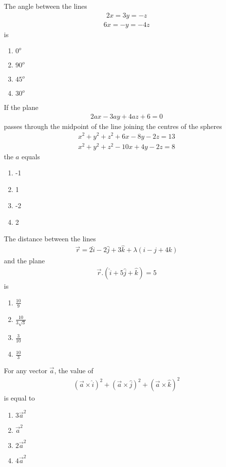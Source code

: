 \item The angle between the lines
\begin{align*}
2x=3y=-z
\end{align*}
\begin{align*}
6x=-y=-4z
\end{align*}
is
\begin{enumerate}
\item $0^{o}$
\item $90^{o}$
\item $45^{o}$
\item $30^{o}$
\end{enumerate}

\item If the plane
\begin{align*}
2ax-3ay+4az+6=0
\end{align*}
passes through the midpoint of the line joining the centres of the spheres
\begin{align}
x^2+y^2+z^2+6x-8y-2z=13
\end{align}
\begin{align}
x^2+y^2+z^2-10x+4y-2z=8
\end{align}
the $a$ equals
\begin{enumerate}
\item -1
\item 1
\item -2
\item 2
\end{enumerate}

\item The distance between the lines
\begin{align*}
\overrightarrow{r}=2\hat{i}-2\hat{j}+3\hat{k}+\lambda(i-j+4k)
\end{align*}
and the plane
\begin{align*}
\overrightarrow{r}.(\hat{i}+5\hat{j}+\hat{k})=5
\end{align*}
is
\begin{enumerate}
\item $\frac{10}{9}$
\item $\frac{10}{3\sqrt{3}}$
\item $\frac{3}{10}$
\item $\frac{10}{3}$
\end{enumerate}

\item For any vector $\overrightarrow{a}$, the value of 
\begin{align*}
(\overrightarrow{a} \times \hat{i})^{2} + (\overrightarrow{a} \times \hat{j})^{2} + (\overrightarrow{a} \times \hat{k})^{2}
\end{align*}
is equal to
\begin{enumerate}
\item $3\overrightarrow{a}^{2}$
\item $\overrightarrow{a}^{2}$
\item $2\overrightarrow{a}^{2}$
\item $4\overrightarrow{a}^{2}$
\end{enumerate}

